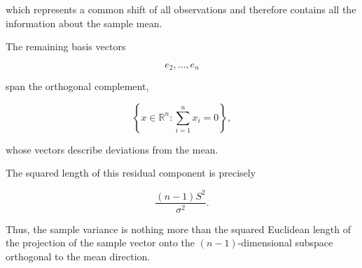 \documentclass[11pt]{article}
\begin{document}
\begin{mdframed}[
		linewidth=0.8pt,
		roundcorner=6pt,
		backgroundcolor=gray!5,
		linecolor=gray!60,
		innertopmargin=10pt,
		innerbottommargin=10pt,
		innerleftmargin=10pt,
		innerrightmargin=10pt
		]
		which represents a common shift of all observations and therefore contains
		all the information about the sample mean.
		
		The remaining basis vectors
		
		\[
		e_2,\ldots,e_n
		\]
		
		span the orthogonal complement,
		
		\[
		\left\{
		x\in\mathbb R^n:
		\sum_{i=1}^{n}x_i=0
		\right\},
		\]
		
		whose vectors describe deviations from the mean.
		
		The squared length of this residual component is precisely
		
		\[
		\boxed{
			\frac{(n-1)S^2}{\sigma^2}.
		}
		\]
		
		Thus, the sample variance is nothing more than the squared Euclidean length
		of the projection of the sample vector onto the $(n-1)$-dimensional
		subspace orthogonal to the mean direction.
		
	\end{mdframed}
	
\end{document}
